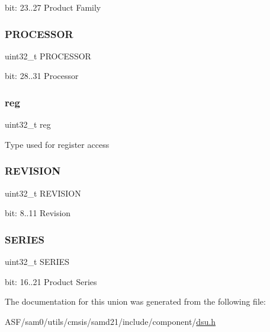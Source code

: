 bit\+: 23..27 Product Family \mbox{\label{union_d_s_u___d_i_d___type_a53a30227239ed5e9e6fef6459081810c}} 
\subsubsection{\texorpdfstring{PROCESSOR}{PROCESSOR}}
{\footnotesize\ttfamily uint32\+\_\+t P\+R\+O\+C\+E\+S\+S\+OR}

bit\+: 28..31 Processor \mbox{\label{union_d_s_u___d_i_d___type_a6b91636401516a477989a336376d7b40}} 
\subsubsection{\texorpdfstring{reg}{reg}}
{\footnotesize\ttfamily uint32\+\_\+t reg}

Type used for register access \mbox{\label{union_d_s_u___d_i_d___type_a8f4be4e701bc29e4363db19a3452906a}} 
\subsubsection{\texorpdfstring{REVISION}{REVISION}}
{\footnotesize\ttfamily uint32\+\_\+t R\+E\+V\+I\+S\+I\+ON}

bit\+: 8..11 Revision \mbox{\label{union_d_s_u___d_i_d___type_aec1777cca650ee0df32be9620d7e6800}} 
\subsubsection{\texorpdfstring{SERIES}{SERIES}}
{\footnotesize\ttfamily uint32\+\_\+t S\+E\+R\+I\+ES}

bit\+: 16..21 Product Series 

The documentation for this union was generated from the following file\+:\begin{DoxyCompactItemize}
\item 
A\+S\+F/sam0/utils/cmsis/samd21/include/component/\mbox{\hyperlink{component_2dsu_8h}{dsu.\+h}}\end{DoxyCompactItemize}
